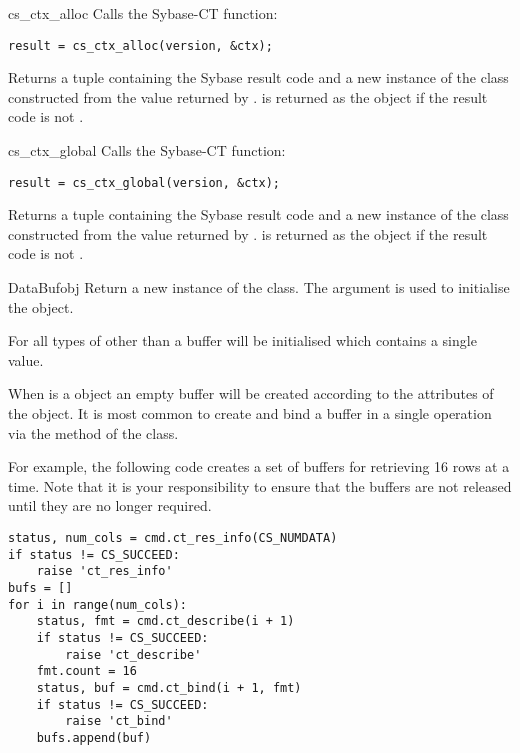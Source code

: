 \begin{funcdesc}{cs_ctx_alloc}{}
Calls the Sybase-CT  function:

\begin{verbatim}
result = cs_ctx_alloc(version, &ctx);
\end{verbatim}

Returns a tuple containing the Sybase result code and a new instance
of the  class constructed from the  value
returned by .   is returned as the
 object if the result code is not .
\end{funcdesc}

\begin{funcdesc}{cs_ctx_global}{}
Calls the Sybase-CT  function:

\begin{verbatim}
result = cs_ctx_global(version, &ctx);
\end{verbatim}

Returns a tuple containing the Sybase result code and a new instance
of the  class constructed from the  value
returned by .   is returned as the
 object if the result code is not .
\end{funcdesc}

\begin{funcdesc}{DataBuf}{obj}
Return a new instance of the  class.  The 
argument is used to initialise the  object.

For all types of  other than  a buffer will
be initialised which contains a single value.

When  is a  object an empty buffer will be
created according to the attributes of the  object.
It is most common to create and bind a buffer in a single operation
via the  method of the  class.

For example, the following code creates a set of buffers for
retrieving 16 rows at a time.  Note that it is your responsibility to
ensure that the buffers are not released until they are no longer
required.

\begin{verbatim}
status, num_cols = cmd.ct_res_info(CS_NUMDATA)
if status != CS_SUCCEED:
    raise 'ct_res_info'
bufs = []
for i in range(num_cols):
    status, fmt = cmd.ct_describe(i + 1)
    if status != CS_SUCCEED:
        raise 'ct_describe'
    fmt.count = 16
    status, buf = cmd.ct_bind(i + 1, fmt)
    if status != CS_SUCCEED:
        raise 'ct_bind'
    bufs.append(buf)
\end{verbatim}
\end{funcdesc}

